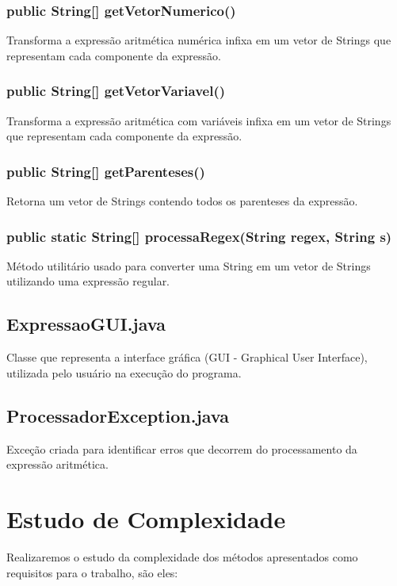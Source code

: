 \documentclass[a4paper,11pt]{article}
\begin{document}
\subsubsection{public String[] getVetorNumerico()}
Transforma a expressão aritmética numérica infixa em um vetor de Strings que representam cada componente da expressão.

\subsubsection{public String[] getVetorVariavel()}
Transforma a expressão aritmética com variáveis infixa em um vetor de Strings que representam cada componente da expressão.

\subsubsection{public String[] getParenteses()}
Retorna um vetor de Strings contendo todos os parenteses da expressão.

\subsubsection{public static String[] processaRegex(String regex, String s)}
Método utilitário usado para converter uma String em um vetor de Strings utilizando uma expressão regular.

\subsection{ExpressaoGUI.java}
Classe que representa a interface gráfica (GUI - Graphical User Interface), utilizada pelo usuário na execução do programa.

\subsection{ProcessadorException.java}
Exceção criada para identificar erros que decorrem do processamento da expressão aritmética.

\section{Estudo de Complexidade}
Realizaremos o estudo da complexidade dos métodos apresentados como requisitos para o trabalho, são eles:
\end{document}
